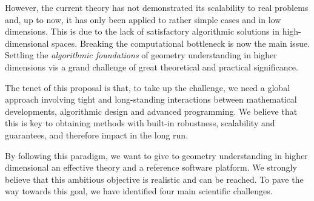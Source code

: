 


However, the current theory has not demonstrated its scalability to real problems and, up to now, it has only been applied to rather simple cases and in low dimensions.  
This is  due to the lack of satisfactory algorithmic solutions in high-dimensional spaces.
Breaking the computational bottleneck is now the main issue.  Settling the {\em algorithmic foundations} of geometry understanding in
higher dimensions
vis a grand challenge of great theoretical and practical significance.


The tenet of this proposal is that, to take up the challenge, we need a global approach involving
tight and long-standing interactions between mathematical developments, algorithmic design and advanced programming. We believe that this is key to obtaining methods with built-in
robustness, scalability and guarantees, and therefore  impact in the long run.

By following this paradigm, we want  to give to  geometry understanding in higher dimensional an effective theory and a reference software platform. 
We strongly believe that this ambitious objective is realistic and can be reached. To pave the way towards this goal, we have identified  four main scientific challenges.



